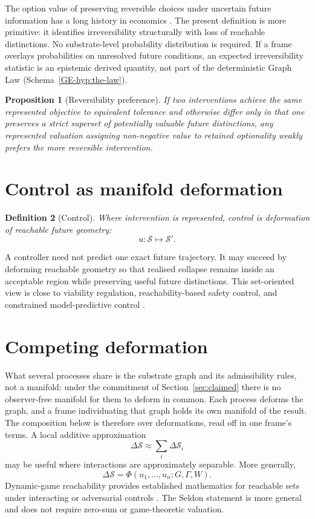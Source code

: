 \documentclass[11pt,a4paper]{article}
\newtheorem{definition}{Definition}[section]
\newtheorem{proposition}[definition]{Proposition}
\theoremstyle{remark}
\newcommand{\Seldon}{\mathcal S}
\begin{document}
The option value of preserving reversible choices under uncertain future information has a long history in economics \citep{arrow1974,henry1974,dixit1994}. The present definition is more primitive: it identifies irreversibility structurally with loss of reachable distinctions. No substrate-level probability distribution is required. If a frame overlays probabilities on unresolved future conditions, an expected irreversibility statistic is an epistemic derived quantity, not part of the deterministic Graph Law
(Schema~\ref{GE-hyp:the-law}).

\begin{proposition}[Reversibility preference]\label{prop:reversibility}
If two interventions achieve the same represented objective to equivalent tolerance and otherwise differ only in that one preserves a strict superset of potentially valuable future distinctions, any represented valuation assigning non-negative value to retained optionality weakly prefers the more reversible intervention.
\end{proposition}

\section{Control as manifold deformation}\label{sec:control}

\begin{definition}[Control]\label{def:control}
Where intervention is represented, control is deformation of reachable future geometry:
\[
u:\Seldon\mapsto\Seldon'.
\]
\end{definition}

A controller need not predict one exact future trajectory. It may succeed by deforming reachable geometry so that realised collapse remains inside an acceptable region while preserving useful future distinctions. This set-oriented view is close to viability regulation, reachability-based safety control, and constrained model-predictive control \citep{aubin1991,mitchell2005,rawlings2017,cunis2021}.

\section{Competing deformation}\label{sec:competing}

What several processes share is the substrate graph and its admissibility rules, not a manifold:
under the commitment of Section~\ref{sec:claimed} there is no observer-free manifold for them to
deform in common. Each process deforms the graph, and a frame individuating that graph holds its own
manifold of the result. The composition below is therefore over deformations, read off in one frame's
terms. A local additive approximation
\[
\Delta\Seldon\approx\sum_i\Delta\Seldon_i
\]
may be useful where interactions are approximately separable. More generally,
\[
\Delta\Seldon=\Phi(u_1,\ldots,u_n;G,\Gamma,W).
\]
Dynamic-game reachability provides established mathematics for reachable sets under interacting or adversarial controls \citep{mitchell2005}. The Seldon statement is more general and does not require zero-sum or game-theoretic valuation.
\end{document}
